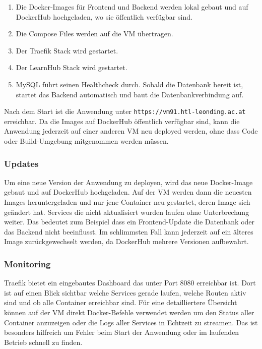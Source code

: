 \begin{enumerate}
    \item Die Docker-Images für Frontend und Backend werden lokal 
    gebaut und auf DockerHub hochgeladen, wo sie öffentlich 
    verfügbar sind.
    \item Die Compose Files werden auf die VM übertragen.
    \item Der Traefik Stack wird gestartet.
    \item Der LearnHub Stack wird gestartet.
    \item MySQL führt seinen Healthcheck durch. Sobald die Datenbank 
    bereit ist, startet das Backend automatisch und baut die 
    Datenbankverbindung auf.
\end{enumerate}

Nach dem Start ist die Anwendung unter 
\texttt{https://vm91.htl-leonding.ac.at} erreichbar. Da die 
Images auf DockerHub öffentlich verfügbar sind, kann die 
Anwendung jederzeit auf einer anderen VM neu deployed werden, 
ohne dass Code oder Build-Umgebung mitgenommen werden müssen.

\subsubsection{Updates}

Um eine neue Version der Anwendung zu deployen, wird das neue 
Docker-Image gebaut und auf DockerHub hochgeladen. Auf der VM 
werden dann die neuesten Images heruntergeladen und nur jene 
Container neu gestartet, deren Image sich geändert hat. Services 
die nicht aktualisiert wurden laufen ohne Unterbrechung weiter. 
Das bedeutet zum Beispiel dass ein Frontend-Update die Datenbank 
oder das Backend nicht beeinflusst. Im schlimmsten Fall kann 
jederzeit auf ein älteres Image zurückgewechselt werden, da 
DockerHub mehrere Versionen aufbewahrt.

\subsubsection{Monitoring}

Traefik bietet ein eingebautes Dashboard das unter Port 8080 
erreichbar ist. Dort ist auf einen Blick sichtbar welche Services 
gerade laufen, welche Routen aktiv sind und ob alle Container 
erreichbar sind. Für eine detailliertere Übersicht können auf 
der VM direkt Docker-Befehle verwendet werden um den Status 
aller Container anzuzeigen oder die Logs aller Services in 
Echtzeit zu streamen. Das ist besonders hilfreich um Fehler 
beim Start der Anwendung oder im laufenden Betrieb schnell 
zu finden.

